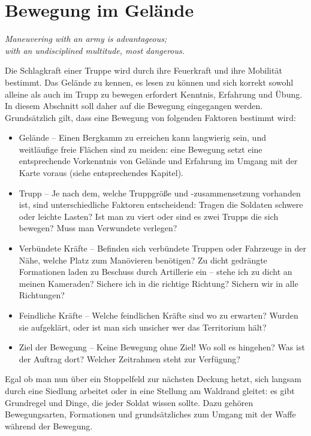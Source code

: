 \newpage
\section{Bewegung im Gelände}
	\begin{center}
		\textit{Maneuvering with an army is advantageous;\\ with an undisciplined multitude, most dangerous.}
	\end{center}

	Die Schlagkraft einer Truppe wird durch ihre Feuerkraft und ihre Mobilität bestimmt. Das Gelände zu kennen, es lesen zu können und sich korrekt sowohl alleine als auch im Trupp zu bewegen erfordert Kenntnis, Erfahrung und Übung. In diesem Abschnitt soll daher auf die Bewegung eingegangen werden.\\

	Grundsätzlich gilt, dass eine Bewegung von folgenden Faktoren bestimmt wird:
	\begin{itemize}
		\item Gelände -- Einen Bergkamm zu erreichen kann langwierig sein, und weitläufige freie Flächen sind zu meiden: eine Bewegung setzt eine 	entsprechende Vorkenntnis von Gelände und Erfahrung im Umgang mit der Karte voraus (siehe entsprechendes Kapitel).
		\item Trupp -- Je nach dem, welche Truppgröße und -zusammensetzung vorhanden ist, sind unterschiedliche Faktoren entscheidend: Tragen die Soldaten schwere oder leichte Lasten? Ist man zu viert oder sind es zwei Trupps die sich bewegen? Muss man Verwundete verlegen? 
		\item Verbündete Kräfte -- Befinden sich verbündete Truppen oder Fahrzeuge in der Nähe, welche Platz zum Manövieren benötigen? Zu dicht gedrängte Formationen laden zu Beschuss durch Artillerie ein -- stehe ich zu dicht an meinen Kameraden? Sichere ich in die richtige Richtung? Sichern wir in alle Richtungen?
		\item Feindliche Kräfte -- Welche feindlichen Kräfte sind wo zu erwarten? Wurden sie aufgeklärt, oder ist man sich unsicher wer das Territorium hält?
		\item Ziel der Bewegung -- Keine Bewegung ohne Ziel! Wo soll es hingehen? Was ist der Auftrag dort? Welcher Zeitrahmen steht zur Verfügung?
	\end{itemize}
	Egal ob man nun über ein Stoppelfeld zur nächsten Deckung hetzt, sich langsam durch eine Siedlung arbeitet oder in eine Stellung am Waldrand gleitet: es gibt Grundregel und Dinge, die jeder Soldat wissen sollte. Dazu gehören Bewegungsarten, Formationen und grundsätzliches zum Umgang mit der Waffe während der Bewegung.

